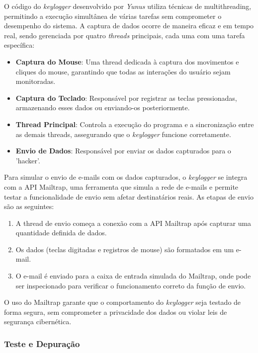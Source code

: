 \documentclass[12pt]{article}
\begin{document}
O código do \textit{keylogger} desenvolvido por \textit{Yunus} utiliza técnicas de multithreading, permitindo a execução simultânea de várias tarefas sem comprometer o desempenho do sistema. A captura de dados ocorre de maneira eficaz e em tempo real, sendo gerenciada por quatro \textit{threads} principais, cada uma com uma tarefa específica:

\begin{itemize}
    \item \textbf{Captura do Mouse}: Uma thread dedicada à captura dos movimentos e cliques do mouse, garantindo que todas as interações do usuário sejam monitoradas.
    \item \textbf{Captura do Teclado}: Responsável por registrar as teclas pressionadas, armazenando esses dados ou enviando-os posteriormente.
    \item \textbf{Thread Principal}: Controla a execução do programa e a sincronização entre as demais threads, assegurando que o \textit{keylogger} funcione corretamente.
    \item \textbf{Envio de Dados}: Responsável por enviar os dados capturados para o 'hacker'.
\end{itemize}

Para simular o envio de e-mails com os dados capturados, o \textit{keylogger} se integra com a API Mailtrap, uma ferramenta que simula a rede de e-mails e permite testar a funcionalidade de envio sem afetar destinatários reais. As etapas de envio são as seguintes:

\begin{enumerate}
    \item A thread de envio começa a conexão com a API Mailtrap após capturar uma quantidade definida de dados.
    \item Os dados (teclas digitadas e registros de mouse) são formatados em um e-mail.
    \item O e-mail é enviado para a caixa de entrada simulada do Mailtrap, onde pode ser inspecionado para verificar o funcionamento correto da função de envio.
\end{enumerate}

O uso do Mailtrap garante que o comportamento do \textit{keylogger} seja testado de forma segura, sem comprometer a privacidade dos dados ou violar leis de segurança cibernética.

\subsubsection{Teste e Depuração}
\end{document}

